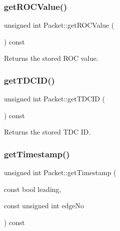 \mbox{\label{class_packet_a2a46912b82833c80b53e01114ef701a1}} 
\subsubsection{\texorpdfstring{get\+R\+O\+C\+Value()}{getROCValue()}}
{\footnotesize\ttfamily unsigned int Packet\+::get\+R\+O\+C\+Value (\begin{DoxyParamCaption}{ }\end{DoxyParamCaption}) const\hspace{0.3cm}{\ttfamily [inline]}}



Returns the stored R\+OC value. 

\mbox{\label{class_packet_a4f4c3d99d89506a577073a2ce9e75e95}} 
\subsubsection{\texorpdfstring{get\+T\+D\+C\+I\+D()}{getTDCID()}}
{\footnotesize\ttfamily unsigned int Packet\+::get\+T\+D\+C\+ID (\begin{DoxyParamCaption}{ }\end{DoxyParamCaption}) const\hspace{0.3cm}{\ttfamily [inline]}}



Returns the stored T\+DC ID. 

\mbox{\label{class_packet_a7a15b0965a125dd8441297007581c637}} 
\subsubsection{\texorpdfstring{get\+Timestamp()}{getTimestamp()}}
{\footnotesize\ttfamily unsigned int Packet\+::get\+Timestamp (\begin{DoxyParamCaption}\item[{const bool}]{leading,  }\item[{const unsigned int}]{edge\+No }\end{DoxyParamCaption}) const}



